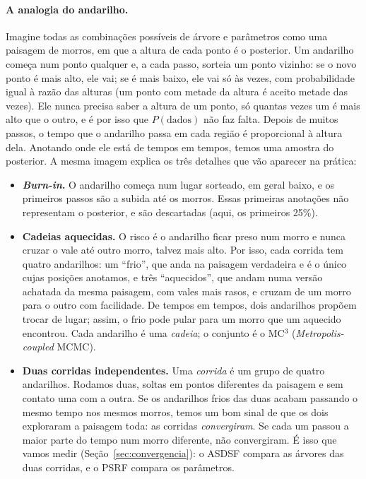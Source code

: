 \documentclass[11pt,a4paper]{article}
\begin{document}
\paragraph{A analogia do andarilho.} Imagine todas as combinações possíveis de árvore e
parâmetros como uma paisagem de morros, em que a altura de cada ponto é o posterior. Um
andarilho começa num ponto qualquer e, a cada passo, sorteia um ponto vizinho: se o novo ponto
é mais alto, ele vai; se é mais baixo, ele vai só às vezes, com probabilidade igual à razão das
alturas (um ponto com metade da altura é aceito metade das vezes). Ele nunca precisa saber a
altura de um ponto, só quantas vezes um é mais alto que o outro, e é por isso que
$P(\text{dados})$ não faz falta. Depois de muitos passos, o tempo que o andarilho passa em cada
região é proporcional à altura dela. Anotando onde ele está de tempos em tempos, temos uma
amostra do posterior. A mesma imagem explica os três detalhes que
vão aparecer na prática:
\begin{itemize}
\item \textbf{\emph{Burn-in}.} O andarilho começa num lugar sorteado, em geral baixo, e os
primeiros passos são a subida até os morros. Essas primeiras anotações não representam o
posterior, e são descartadas (aqui, os primeiros 25\%).
\item \textbf{Cadeias aquecidas.} O risco é o andarilho ficar preso num morro e nunca cruzar o
vale até outro morro, talvez mais alto. Por isso, cada corrida tem quatro andarilhos: um
``frio'', que anda na paisagem verdadeira e é o único cujas posições anotamos, e três
``aquecidos'', que andam numa versão achatada da mesma paisagem, com vales mais rasos, e cruzam
de um morro para o outro com facilidade. De tempos em tempos, dois andarilhos propõem trocar de
lugar; assim, o frio pode pular para um morro que um aquecido encontrou. Cada andarilho é uma
\emph{cadeia}; o conjunto é o MC$^3$ (\emph{Metropolis-coupled} MCMC).
\item \textbf{Duas corridas independentes.} Uma \emph{corrida} é um grupo de quatro
andarilhos. Rodamos duas, soltas em pontos diferentes da paisagem e sem contato uma com a
outra. Se os andarilhos frios das duas acabam passando o mesmo tempo nos mesmos morros, temos
um bom sinal de que os dois exploraram a paisagem toda: as corridas \emph{convergiram}. Se cada
um passou a maior parte do tempo num morro diferente, não convergiram. É isso que vamos medir
(Seção~\ref{sec:convergencia}): o ASDSF compara as árvores das duas corridas, e o PSRF compara
os parâmetros.
\end{itemize}
\end{document}

